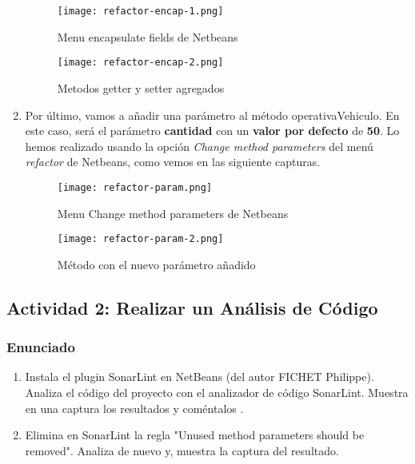 \begin{enumerate}
    \begin{figure}[H]
        \centering
        \texttt{[image: refactor-encap-1.png]}
        \caption{Menu encapsulate fields de Netbeans}
    \end{figure}

        \begin{figure}[H]
        \centering
        \texttt{[image: refactor-encap-2.png]}
        \caption{Metodos getter y setter agregados}
    \end{figure}

    \item Por último, vamos a añadir una parámetro al método operativaVehiculo. En este caso, será el parámetro \textbf{cantidad} con un \textbf{valor por defecto} de \textbf{50}. Lo hemos realizado usando la opción \textit{Change method parameters} del menú \textit{refactor} de Netbeans, como vemos en las siguiente capturas.

    \begin{figure}[H]
        \centering
        \texttt{[image: refactor-param.png]}
        \caption{Menu Change method parameters de Netbeans}
    \end{figure}

     \begin{figure}[H]
         \centering
        \texttt{[image: refactor-param-2.png]}
        \caption{Método con el nuevo parámetro añadido}
    \end{figure}
\end{enumerate}

\subsection{Actividad 2: Realizar un Análisis de Código}
\subsubsection{Enunciado}
\begin{enumerate}
    \item  Instala el plugin SonarLint en NetBeans (del autor FICHET Philippe). Analiza el código del proyecto con el analizador de código SonarLint. Muestra en una captura los resultados y coméntalos .

    \item Elimina en SonarLint la regla "Unused method parameters should be removed". Analiza de nuevo y, muestra la captura del resultado.
\end{enumerate}

